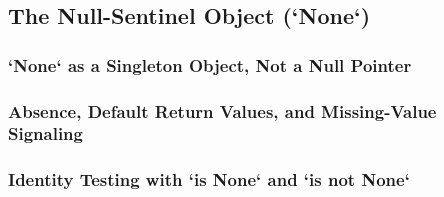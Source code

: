 \subsection{The Null-Sentinel Object (`None`)}
\subsubsection{`None` as a Singleton Object, Not a Null Pointer}
\subsubsection{Absence, Default Return Values, and Missing-Value Signaling}
\subsubsection{Identity Testing with `is None` and `is not None`}

